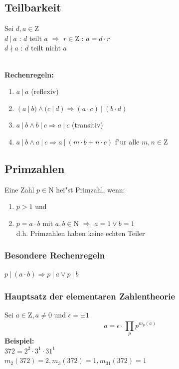 \documentclass[10pt,a4paper,landscape]{article}
\begin{document}
\begin{multicols*}{3}
		\subsection{Teilbarkeit}
		\begin{onehalfspacing}
			Sei $d, a \in \mathrm{Z}$ \\
			$d~|~a$ : $d$ teilt $a$ $\Rightarrow$ $r \in \mathrm{Z}$ : $a = d \cdot r$\\
			$d \nmid a$ : $d$ teilt nicht $a$\\
		\end{onehalfspacing}
		\\
		\textbf{Rechenregeln:}
		\begin{enumerate}
			\item $a~|~a$ (reflexiv) 
			\item $(a~|~b) \land (c~|~d) \Rightarrow (a \cdot c)~|~(b \cdot d)$
			\item $a~|~b \land b~|~c \Rightarrow a~|~c$ (transitiv) 
			\item $a~|~b \land a~|~c \Rightarrow a~|~(m \cdot b + n \cdot c)$ f"ur alle $m,n \in \mathrm{Z}$
		\end{enumerate}
		
		\subsection{Primzahlen}
		Eine Zahl $p \in \mathrm{N}$ hei"st Primzahl, wenn:
		\begin{enumerate}
			\item $p > 1$ und
			\item $p = a \cdot b$ mit $a,b \in \mathrm{N}$ $\Rightarrow$ $a =  1 \lor b = 1$\\
			d.h. Primzahlen haben keine echten Teiler
		\end{enumerate}
		
		\subsubsection{Besondere Rechenregeln}
		\begin{onehalfspacing}
			$p~|~(a \cdot b) \Rightarrow p~|~a \lor p~|~b$
		\end{onehalfspacing}
		
		\subsubsection{Hauptsatz der elementaren Zahlentheorie}
		Sei $a \in \mathrm{Z}, a \neq 0$ und $\epsilon = \pm 1$ \\
		\[
		a =  \epsilon \cdot \prod_{p}^{} p^{m_p(a)}
		\]
		\textbf{Beispiel:}\\
		$372 = 2^2 \cdot 3^1 \cdot 31^1$\\
		$m_2(372) = 2, m_3(372) = 1, m_31(372) = 1$
		

\end{multicols*}
\end{document}
